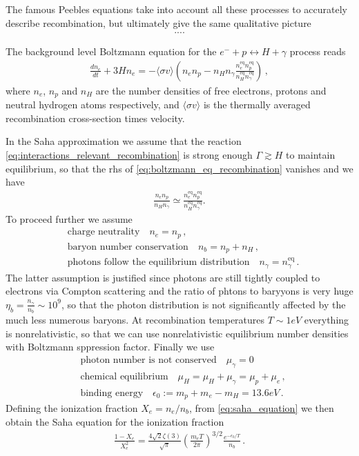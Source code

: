 The famous Peebles equations \cite{} take into account all these processes to accurately describe recombination, but ultimately give the same qualitative picture
\begin{align}
    ....
\end{align}

The background level Boltzmann equation for the $e^- + p \leftrightarrow H + \gamma$ process reads
\begin{align}\label{eq:boltzmann_eq_recombination}
    \frac{dn_e}{dt} + 3 H n_e = - \langle \sigma v \rangle \left( n_e n_p - n_H n_\gamma \frac{n_e^{\text{eq}} n_p^{\text{eq}}}{n_H^{\text{eq}} n_\gamma^{\text{eq}}} \right)\,,
\end{align}
where $n_e$, $n_p$ and $n_H$ are the number densities of free electrons, protons and neutral hydrogen atoms respectively, and $\langle \sigma v \rangle$ is the thermally averaged recombination cross-section times velocity.

In the Saha approximation we assume that the reaction \eqref{eq:interactions_relevant_recombination} is strong enough $\Gamma \gtrsim H$ to maintain equilibrium, so that the rhs of \eqref{eq:boltzmann_eq_recombination} vanishes and we have
\begin{align}\label{eq:saha_equation}
    \frac{n_en_p}{n_H n_\gamma} \simeq \frac{n_e^{\text{eq}} n_p^{\text{eq}}}{n_H^{\text{eq}} n_\gamma^{\text{eq}}}.
\end{align}
To proceed further we assume
\begin{align}
    &\text{charge neutrality}\quad n_e = n_p\,,\\
    &\text{baryon number conservation}\quad n_b = n_p + n_H\,,\\
    &\text{photons follow the equilibrium distribution}\quad n_\gamma = n_\gamma^{\text{eq}}\,.
\end{align}
The latter assumption is justified since photons are still tightly coupled to electrons via Compton scattering and the ratio of phtons to baryyons is very huge $\eta_b = \frac{n_\gamma}{n_b} \sim 10^{9}$, so that the photon distribution is not significantly affected by the much less numerous baryons.
At recombination temperatures $T\sim 1eV$ everything is nonrelativistic, so that we can use nonrelativistic equilibrium number densities with Boltzmann sppression factor.
Finally we use 
\begin{align}
    &\text{photon number is not conserved}\quad \mu_\gamma=0\\
    &\text{chemical equilibrium}\quad \mu_H =\mu_H+\mu_\gamma= \mu_p + \mu_e\,,\\
    &\text{binding energy}\quad \epsilon_0 := m_p + m_e - m_H = 13.6 eV\,.
\end{align}
Defining the ionization fraction $X_e = n_e/n_b$, from \eqref{eq:saha_equation} we then obtain the Saha equation for the ionization fraction
\begin{align}\label{eq:saha_equation_ionization_fraction}
    \frac{1 - X_e}{X_e^2} = \frac{4 \sqrt{2} \zeta(3)}{\sqrt{\pi}} \left( \frac{m_e T}{2 \pi} \right)^{3/2} \frac{e^{- \epsilon_0/T}}{n_b}\,.
\end{align}

